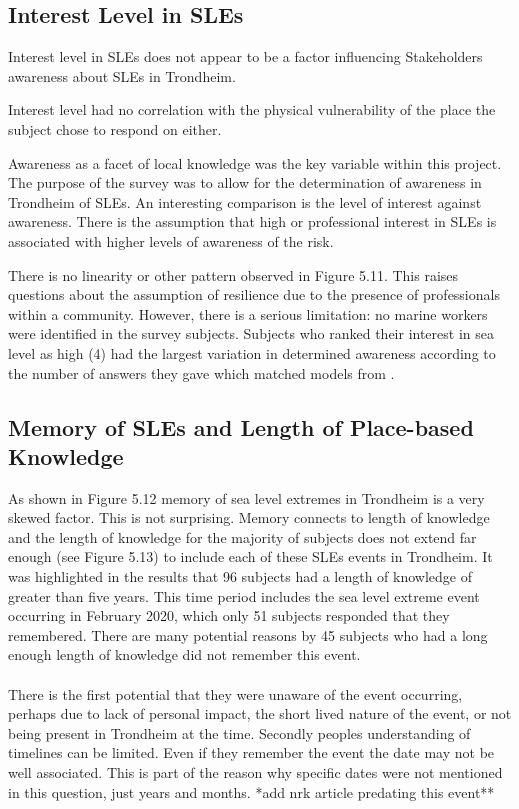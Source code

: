 \subsection{Interest Level in SLEs}
Interest level in SLEs does not appear to be a factor influencing Stakeholders awareness about SLEs in Trondheim. 

Interest level had no correlation with the physical vulnerability of the place the subject chose to respond on either. 

  Awareness as a facet of local knowledge was the key variable within this project. The purpose of the survey was to allow for the determination of awareness in Trondheim of SLEs. An interesting comparison is the level of interest against awareness. There is the assumption that high or professional interest in SLEs is associated with higher levels of awareness of the risk. 


  There is no linearity or other pattern observed in Figure 5.11. This raises questions about the assumption of resilience due to the presence of professionals within a community. However, there is a serious limitation: no marine workers were identified in the survey subjects. Subjects who ranked their interest in sea level as high (4) had the largest variation in determined awareness according to the number of answers they gave which matched models from \cite{kartverket_se_2020}. 

\subsection{Memory of SLEs and Length of Place-based Knowledge}
As shown in Figure 5.12 memory of sea level extremes in Trondheim is a very skewed factor. This is not surprising. Memory connects to length of knowledge and the length of knowledge for the majority of subjects does not extend far enough (see Figure 5.13) to include each of these SLEs events in Trondheim. It was highlighted in the results that 96 subjects had a length of knowledge of greater than five years. This time period includes the sea level extreme event occurring in February 2020, which only 51 subjects responded that they remembered. There are many potential reasons by 45 subjects who had a long enough length of knowledge did not remember this event. 
\paragraph{}
There is the first potential that they were unaware of the event occurring, perhaps due to lack of personal impact, the short lived nature of the event, or not being present in Trondheim at the time. Secondly peoples understanding of timelines can be limited. Even if they remember the event the date may not be well associated. This is part of the reason why specific dates were not mentioned in this question, just years and months. 
*add nrk article predating this event**


